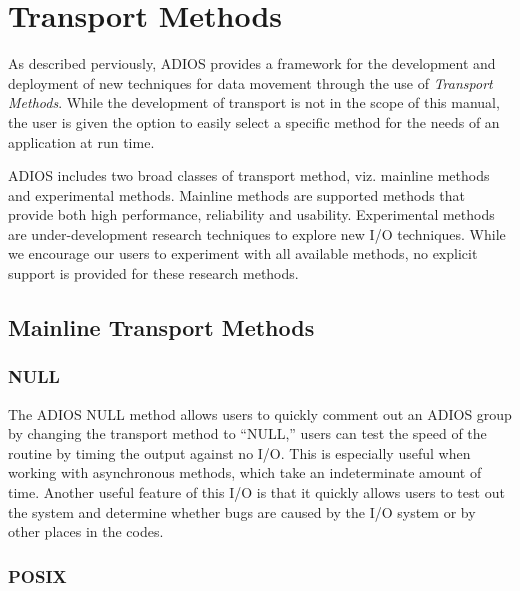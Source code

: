 \chapter{Transport Methods}
\label{chapter-methods}

As described perviously, ADIOS provides a framework for the development and
deployment of new techniques for data movement through the use of {\em
  Transport Methods}. While the development of transport is not in the scope of
this manual, the user is given the option to easily select a specific method for
the needs of an application at run time. 

ADIOS includes two broad classes of transport method, viz. mainline methods and
experimental methods. Mainline methods are supported methods that provide both
high performance, reliability and usability. Experimental methods are
under-development research techniques to explore new I/O techniques. While we
encourage our users to experiment with all available methods, no explicit
support is provided for these research methods. 


\section{Mainline Transport Methods}

\subsection{NULL}

The ADIOS NULL method allows users to quickly comment out an ADIOS group by changing 
the transport method to ``NULL,'' users can test the speed of the routine by timing 
the output against no I/O. This is especially useful when working with asynchronous 
methods, which take an indeterminate amount of time.  Another useful feature of 
this I/O is that it quickly allows users to test out the system and determine whether 
bugs are caused by the I/O system or by other places in the codes.

\subsection{POSIX}

